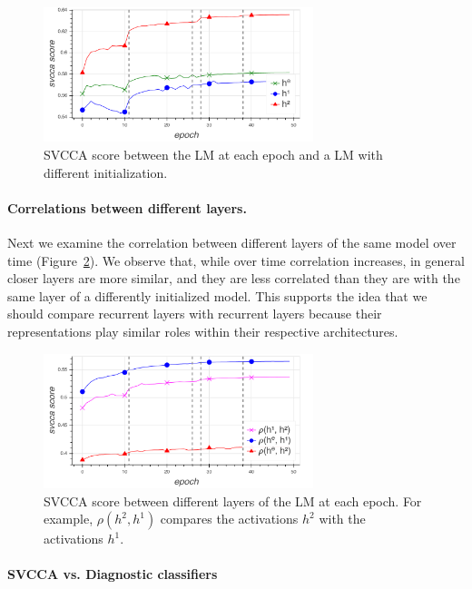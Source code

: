 \begin{figure}
\includegraphics[width=0.7\textwidth]{svcca/random_correlation}\centering
\caption{SVCCA score between the LM at each epoch and a LM with different initialization.}
\label{fig:random_convergence}
\end{figure}

\paragraph{Correlations between different layers.} Next we examine the correlation between different layers of the same model over time (Figure~\ref{fig:between_layers}). We observe that, while over time correlation increases, in general closer layers are more similar, and they are less correlated than they are with the same layer of a differently initialized model. This supports the idea that we should compare  recurrent layers with recurrent layers because their representations play similar roles within their respective architectures.

\begin{figure}
\includegraphics[width=0.7\textwidth]{svcca/between_layers}\centering
\caption{SVCCA score between different layers of the LM at each epoch. For example, $\rho({h^2, h^1})$ compares the activations $h^2$ with the activations $h^1$.}
\label{fig:between_layers}
\end{figure}

\paragraph{SVCCA vs. Diagnostic classifiers}

